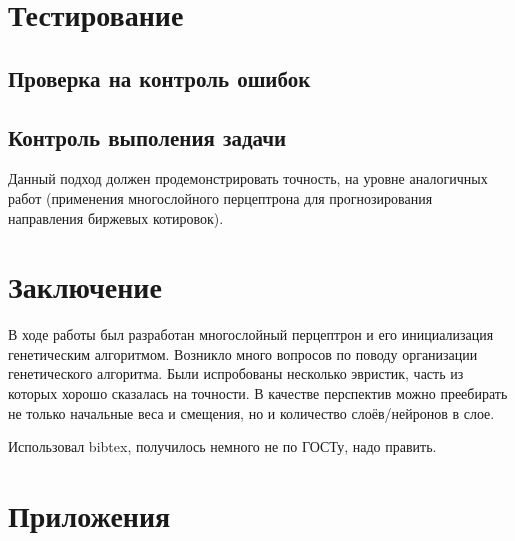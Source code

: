 \documentclass[a4paper,12pt]{article}
\begin{document}
\newpage\section{Тестирование}
\subsection{Проверка на контроль ошибок}
\subsection{Контроль выполения задачи}
Данный подход должен продемонстрировать точность, на уровне аналогичных работ (применения многослойного перцептрона для прогнозирования направления биржевых котировок).

\newpage\section*{Заключение}
В ходе работы был разработан многослойный перцептрон и его инициализация генетическим алгоритмом. Возникло много вопросов по поводу организации генетического алгоритма. Были испробованы несколько эвристик, часть из которых хорошо сказалась на точности. В качестве перспектив можно преебирать не только начальные веса и смещения, но и количество слоёв/нейронов в слое.


\newpage
\renewcommand\refname{Список использованных источников}
Использовал bibtex, получилось немного не по ГОСТу, надо править.
\nocite{*}


\newpage\section*{Приложения}
\end{document}
